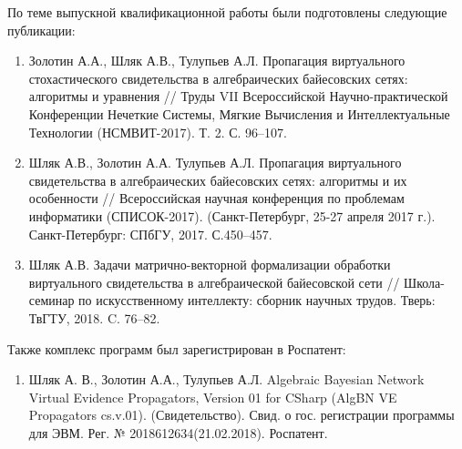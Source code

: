 По теме выпускной квалификационной работы были подготовлены следующие публикации:
\begin{enumerate}
\item Золотин А.А., Шляк А.В., Тулупьев А.Л. Пропагация виртуального стохастического свидетельства в алгебраических байесовских сетях: алгоритмы и уравнения // Труды VII Всероссийской Научно-практической Конференции Нечеткие Системы, Мягкие Вычисления и Интеллектуальные Технологии (НСМВИТ-2017). Т. 2. С. 96--107.
\item  Шляк А.В., Золотин А.А. Тулупьев А.Л. Пропагация виртуального свидетельства в алгебраических байесовских сетях: алгоритмы и их особенности // Всероссийская научная конференция по проблемам информатики (СПИСОК-2017). (Санкт-Петербург, 25-27 апреля 2017 г.). Санкт-Петербург: СПбГУ, 2017. С.450--457.
\item Шляк А.В. Задачи матрично-векторной формализации
обработки виртуального свидетельства в алгебраической
байесовской сети // Школа-семинар по искусственному интеллекту: сборник научных трудов. Тверь: ТвГТУ, 2018. C. 76--82.
\end{enumerate}
Также комплекс программ был зарегистрирован в Роспатент:
\begin{enumerate}
\item Шляк А. В., Золотин А.А., Тулупьев А.Л. Algebraic Bayesian Net\-work Virtual Evidence Propagators, Version 01 for CSharp (AlgBN VE Propagators cs.v.01). (Свидетельство). Свид. о гос. регистрации программы для ЭВМ. Рег. № 2018612634(21.02.2018). Роспатент.
\end{enumerate}